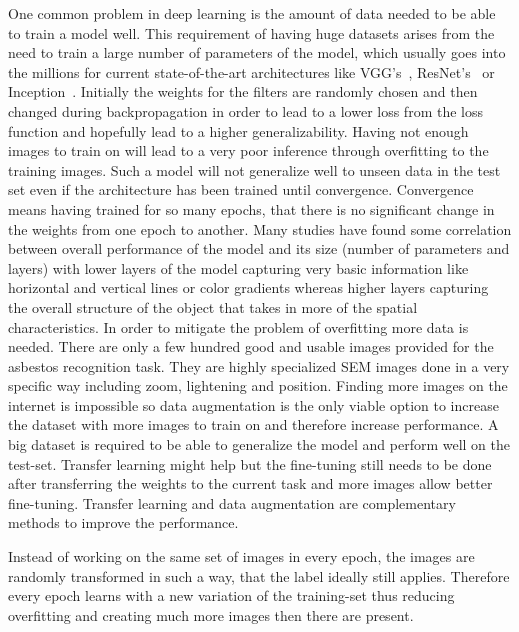 One common problem in deep learning is the amount of data needed to be able to train a model well. This requirement of having huge datasets arises from the need to train a large number of parameters of the model, which usually goes into the millions for current state-of-the-art architectures like VGG's~\cite{simonyan2014very}, ResNet's~\cite{he2016deep} or Inception~\cite{szegedy2015going, szegedy2016rethinking}. Initially the weights for the filters are randomly chosen and then changed during backpropagation in order to lead to a lower loss from the loss function and hopefully lead to a higher generalizability. Having not enough images to train on will lead to a very poor inference through overfitting to the training images. Such a model will not generalize well to unseen data in the test  set even if the architecture has been trained until convergence. Convergence means having trained  for so many epochs, that there is no significant change in the weights from one epoch to another. Many studies have found some correlation between overall performance of the model and its size (number of parameters and layers) with lower layers of the model capturing very basic information like horizontal and vertical lines or color gradients whereas higher layers capturing the overall structure of the object that takes in more of the spatial characteristics. In order to mitigate the problem of overfitting more data is needed. There are only a few hundred good and usable images provided for the asbestos recognition task. They are highly specialized SEM images done in a very specific way including zoom, lightening and position. Finding more images on the internet is impossible so data augmentation is the only viable option to increase the dataset with more images to train on and therefore increase performance. A big dataset is required to be able to generalize the model and perform well on the test-set. Transfer learning might help but the fine-tuning still needs to be done after transferring the weights to the current task and more images allow better fine-tuning. Transfer learning and data augmentation are complementary methods to improve the performance.

Instead of working on the same set of images in every epoch, the images are randomly transformed in such a way, that the label ideally still applies. Therefore every epoch learns with a new variation of the training-set thus reducing overfitting and creating much more images then there are present.

